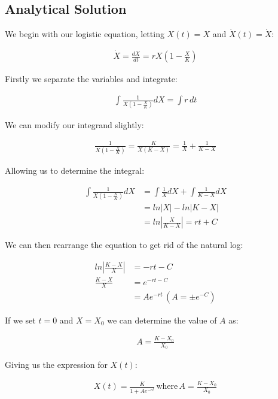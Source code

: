\documentclass[]{article}
\begin{document}
	\subsection{Analytical Solution}
	We begin with our logistic equation, letting $X(t) = X$ and $\dot X(t) = \dot X$:
	
	\begin{align}
		\dot X = \frac{dX}{dt} = rX\left(1 - \frac{X}{K}\right)		
	\end{align}
	
	Firstly we separate the variables and integrate:
	
	\begin{align}
		\int\frac{1}{X\left(1 - \frac{X}{K}\right)} dX = \int r \hspace{2pt} dt
	\end{align}
	
	We can modify our integrand slightly:
	
	\begin{align}
		\frac{1}{X\left(1 - \frac{X}{K}\right)} = \frac{K}{X(K - X)} = \frac{1}{X} + \frac{1}{K - X}
	\end{align}
	
	Allowing us to determine the integral:
	
	\begin{align}
		\int\frac{1}{X\left(1 - \frac{X}{K}\right)} dX &= \int \frac{1}{X} dX + \int \frac{1}{K - X} dX \\
		&= ln|X| - ln|K - X| \\
		&= ln\left|\frac{X}{K - X}\right| = rt + C 
	\end{align}
	
	We can then rearrange the equation to get rid of the natural log:
	
	\begin{align}
		ln\left|\frac{K - X}{X}\right| &= -rt - C \\
		\frac{K - X}{X} &= e^{-rt - C} \\
		&= Ae^{-rt} \hspace{2pt} (A = \pm e^{-C})
	\end{align}
	
	If we set $t = 0$ and $X = X_0$ we can determine the value of $A$ as:
	
	\begin{align}
		A = \frac{K - X_0}{X_0}
	\end{align}
	
	Giving us the expression for $X(t)$:
	
	\begin{align}
		X(t) = \frac{K}{1 + Ae^{-rt}} \hspace{2pt} \text{where} \hspace{2pt} A = \frac{K - X_0}{X_0}
	\end{align}
	
\end{document}
